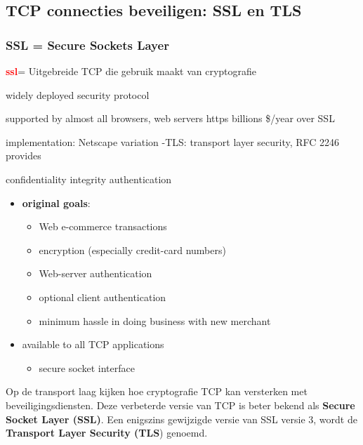 \subsection{TCP connecties beveiligen: SSL en TLS}

\subsubsection{SSL = Secure Sockets Layer}

\textcolor{red}{\textbf{\acrfull{ssl}}}=  Uitgebreide TCP die gebruik maakt van cryptografie

\begin{multicols}{2}
\bi
\itf widely deployed security protocol

\bi
\itf supported by almost all browsers, web servers
\itf https
\itf billions \$/year over SSL
    \ei

    \itf implementation: Netscape
    \itf variation -TLS: transport layer security, RFC 2246
    \itf provides

    \bi
    \itf confidentiality
    \itf integrity
    \itf authentication
    \ei
\ei
\end{multicols}


\begin{itemize}
\item \textbf{original goals}:
    \begin{itemize}
    \item Web e-commerce transactions 
    \item encryption (especially credit-card numbers)
    \item Web-server authentication
    \item optional client authentication
    \item minimum hassle in doing business with new merchant
    \end{itemize}
\item available to all TCP applications
    \begin{itemize}
    \item secure socket interface
    \end{itemize}
\end{itemize}


\noindent Op de transport laag kijken hoe cryptografie TCP kan versterken met beveiligingsdiensten. Deze verbeterde versie van TCP is beter bekend als \textbf{Secure Socket Layer (SSL)}. Een enigszins gewijzigde versie van SSL versie 3, wordt de \textbf{Transport Layer Security (TLS}) genoemd.

